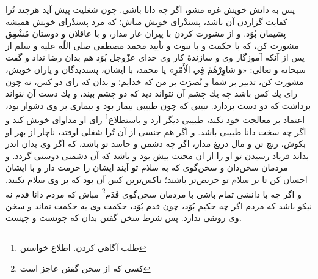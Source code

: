 پس به دانش خويش غره مشو، اگر چه دانا باشى. چون شغليت پيش آيد هرچند تُرا كفايت گزاردن آن باشد، پسندْراى خويش مباش؛ كه مرد پسندْراى خويش هميشه پشيمان بُوَد. و از مشورت كردن با پيران عار مدار، و با عاقلان و دوستان مُشْفِق مشورت كن، كه با حكمت و با نبوت و تأييد محمد مصطفى صلى اللّه عليه و سلم از پس از آنكه آموزگار وى و سازندۀ كار وى خداى عزّوجل بُوَد هم بدان رضا نداد و گفت سبحانه و تعالى: «وَ شاوِرْهُمْ فِي الْأَمْرِ» يا محمد، با ايشان، پسنديدگان و ياران خويش، مشورت كن، تدبير بر شما و نُصرَت بر من كه خدايم؛ و بدان كه راى دو كس، نه چون راى يك كس باشد چه يك چشم آن نتواند ديد كه دو چشم بيند، و يك دست آن نتواند برداشت كه دو دست بردارد. نبينى كه چون طبيبى بيمار بود و بيمارى بر وى دشوار بود، اعتماد بر معالجت خود نكند، طبيبى ديگر آرد و باستطلاع\footnote{طلب آگاهی کردن. اطلاع خواستن} راى او مداواى خويش كند و اگر چه سخت دانا طبيبى باشد. و اگر هم جنسى از آن تُرا شغلى اوفتد، ناچار از بهر او بكوش، رنج تن و مال دريغ مدار، اگر چه دشمن و حاسد تو باشد، كه اگر وى بدان اندر بداند فرياد رسيدن تو او را از ان محنت بيش بود و باشد كه آن دشمنى دوستى گردد. و مردمان سخن‌دان و سخن‌گوى كه به سلام تو آيند ايشان را حرمت دار و با ايشان احسان كن تا بر سلام تو حريص‌تر باشند؛ ناكس‌ترين كس آن بود كه بر وى سلام نكنند. و اگر چه با دانشى تمام باشى با مردمان سخن‌گوى فَدَم\footnote{کسی که از سخن گفتن عاجز است} مباش كه مردم دانا فدم نه نيكو باشد كه مردم اگر چه حكيم بُوَد، چون فدم بُوَد، حكمت وى به حكمت نماند و سخن وى رونقى ندارد. پس شرط سخن گفتن بدان كه چونست و چيست.




\newpage









